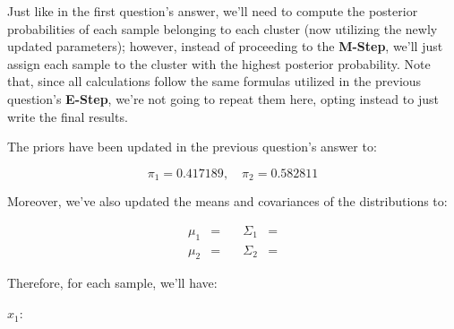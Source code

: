 \documentclass[12pt]{article}
\begin{document}
\begin{enumerate}[leftmargin=\labelsep]
\begin{enumerate}[leftmargin=\labelsep]
                Just like in the first question's answer, we'll need to compute the posterior
                probabilities of each sample belonging to each cluster (now utilizing the newly updated
                parameters); however, instead of proceeding to the \textbf{M-Step}, we'll just assign
                each sample to the cluster with the highest posterior probability. Note that,
                since all calculations follow the same formulas utilized in the previous
                question's \textbf{E-Step}, we're not going to repeat them here,
                opting instead to just write the final results.

                The priors have been updated in the previous question's answer to:

                \begin{equation*}
                  \pi_1 = 0.417189, \quad
                  \pi_2 = 0.582811
                \end{equation*}

                Moreover, we've also updated the means and covariances of the distributions
                to:

                \begin{equation*}
                  \begin{aligned}
                    \mu_1 & =        \quad
                          & \Sigma_1                                             & =  \\
                    \mu_2 & =  \quad
                          & \Sigma_2                                             & = 
                  \end{aligned}
                \end{equation*}


                Therefore, for each sample, we'll have:

                \vspace*{0.5cm}

                \begin{paracol}{3}
                  \setlength{\columnseprule}{1pt}
                  \def\columnseprulecolor{\color{black}}
                  \centering

                  $x_1$:


\end{paracol}
\end{enumerate}
\end{enumerate}
\end{document}

